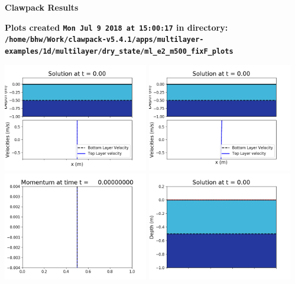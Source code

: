 \documentclass[11pt]{article}
\begin{document}
        \begin{center}{\Large\bf Clawpack Results}\vskip 5pt
        
        \bf Plots created {\tt Mon Jul  9 2018 at 15:00:17} in directory: \vskip 5pt
        \verb+/home/bhw/Work/clawpack-v5.4.1/apps/multilayer-examples/1d/multilayer/dry_state/ml_e2_m500_fixF_plots+
        \end{center}
        \vskip 5pt
        \includegraphics[width=0.475\textwidth]{frame0000fig1001.png}
\includegraphics[width=0.475\textwidth]{frame0000fig1002.png}
\vskip 10pt 
\includegraphics[width=0.475\textwidth]{frame0000fig1003.png}
\includegraphics[width=0.475\textwidth]{frame0000fig1006.png}
\end{document}
